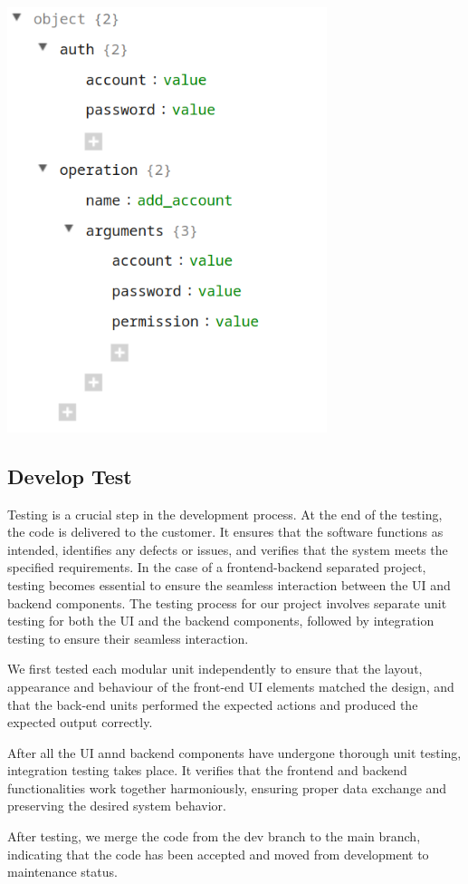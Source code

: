 {\begin{center}
  \centering
  \includegraphics[width=0.7\textwidth]{pics/4.png}
\end{center}

\hypertarget{develop-test}{%
\subsection{Develop Test}\label{develop-test}}

Testing is a crucial step in the development process. At the end of the
testing, the code is delivered to the customer. It ensures that the
software functions as intended, identifies any defects or issues, and
verifies that the system meets the specified requirements. In the case
of a frontend-backend separated project, testing becomes essential to
ensure the seamless interaction between the UI and backend components.
The testing process for our project involves separate unit testing for
both the UI and the backend components, followed by integration testing
to ensure their seamless interaction.

We first tested each modular unit independently to ensure that the
layout, appearance and behaviour of the front-end UI elements matched
the design, and that the back-end units performed the expected actions
and produced the expected output correctly.

After all the UI annd backend components have undergone thorough unit
testing, integration testing takes place. It verifies that the frontend
and backend functionalities work together harmoniously, ensuring proper
data exchange and preserving the desired system behavior.

After testing, we merge the code from the dev branch to the main branch,
indicating that the code has been accepted and moved from development to
maintenance status.
}
